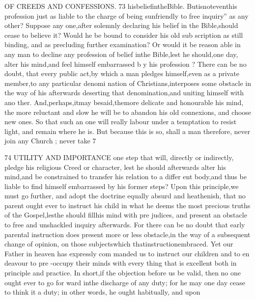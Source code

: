\documentclass[
]{book}
\begin{document}
OF CREEDS AND CONFESSIONS. 73
hisbeliefintheBible. Butisnoteventhis
profession just as liable to the charge of being sunfriendly to free inquiry'' as any other? Suppose any one,after solemnly declaring his belief in the Bible,should cease to believe it? Would he be bound to consider his old sub
scription as still binding, and as precluding further examination? Or would it be reason
able in any man to decline any profession of belief inthe Bible,lest he should,one day,
alter his mind,and feel himself embarrassed b y his profession ?
There can be no doubt, that every public
act,by which a man pledges himself,even as a private member,to any particular denomi
nation of Christians,interposes some obstacle in the way of his afterwards deserting that
denomination,and uniting himself with ano ther. And,perhaps,itmay besaid,themore delicate and honourable his mind, the more reluctant and slow he will be to abandon his old connexions, and choose new ones. So
that such an one will really labour under a temptation to resist light, and remain where he is. But because this is so, shall a man
therefore, never join any Church ; never take
7

74 UTILITY AND IMPORTANCE
one step that will, directly or indirectly, pledge his religious Creed or character, lest he should afterwards alter his mind,and be constrained to transfer his relation to a differ ent body,and thus be liable to find himself embarrassed by his former steps? Upon this principle,we must go further, and adopt the
doctrine equally absurd and heathenish, that no parent ought ever to instruct his child in
what he deems the most precious truths of the Gospel,lesthe should fillhis mind with pre judices, and present an obstacle to free and
unshackled inquiry afterwards. For there can be no doubt that early parental instruction does present more or less obstacle,in the way of a subsequent change of opinion, on those subjectswhich thatinstructionembraced. Yet our Father in heaven has expressly com manded us to instruct our children and to en deavour to pre -occupy their minds with every thing that is excellent both in principle and practice. In short,if the objection before us be valid, then no one ought ever to go for ward inthe discharge of any duty; for he
may one day cease to think it a duty; in other words, he ought habitually, and upon
\end{document}
